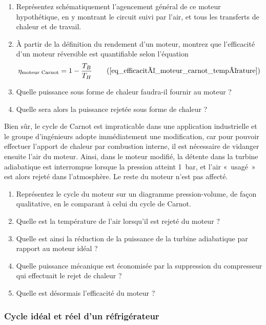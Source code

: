 	\begin{enumerate}
		\item Représentez schématiquement l’agencement général de ce moteur hypothétique, en y montrant le circuit suivi par l’air, et tous les transferts de chaleur et de travail.
		\item À partir de la définition du rendement d’un moteur, montrez que l’efficacité d’un moteur réversible est quantifiable selon l’équation
			\begin{equation}
				\eta_{\text{moteur Carnot}} = 1 - \frac{T_B}{T_H} \tag{\ref{eq_efficacité_moteur_carnot_température}}
			\end{equation}
		\item Quelle puissance sous forme de chaleur faudra-il fournir au moteur ?
		\item Quelle sera alors la puissance rejetée sous forme de chaleur ?
	\end{enumerate}

	Bien sûr, le cycle de Carnot est impraticable dans une application industrielle et le groupe d’ingénieurs adopte immédiatement une modification, car pour pouvoir effectuer l’apport de chaleur par combustion interne, il est nécessaire de vidanger ensuite l’air du moteur. Ainsi, dans le moteur modifié, la détente dans la turbine adiabatique est interrompue lorsque la pression atteint \SI{1}{\bar}, et l’air «~usagé~» est alors rejeté dans l’atmosphère. Le reste du moteur n’est pas affecté.
	
	\begin{enumerate}
		\item Représentez le cycle du moteur sur un diagramme pression-volume, de façon qualitative, en le comparant à celui du cycle de Carnot.
		\item Quelle est la température de l’air lorsqu’il est rejeté du moteur ?
		\item Quelle est ainsi la réduction de la puissance de la turbine adiabatique par rapport au moteur idéal ?
		\item Quelle puissance mécanique est économisée par la suppression du compresseur qui effectuait le rejet de chaleur ?
		\item Quelle est désormais l’efficacité du moteur ?
	\end{enumerate}


\subsubsection{Cycle idéal et réel d’un réfrigérateur}
\label{exo_cours_refrigerateur_carnot}
\wherefrom{[DS n°2 2011, 4pts]}

